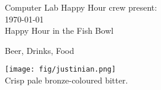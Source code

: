 \documentclass[a4paper,portrait]{article}
\newcommand{\placetextbox}[3]{%
  \setbox0=\hbox{#3}%
  \AddToShipoutPictureFG*{%
    \put(\LenToUnit{#1\paperwidth},\LenToUnit{#2\paperheight}){\vtop{{\null}\makebox[0pt][c]{#3}}}%
  }%
}%
\begin{document}
\sf
\thispagestyle{empty}

\begin{center}

    {\Large Computer Lab Happy Hour crew present:} \\ \smallskip
\today \\ \smallskip
    {\Large Happy Hour in the Fish Bowl }

    \vfill

    {\huge Beer, Drinks, Food}\\ \bigskip \bigskip

    \vfill

    \texttt{[image: fig/justinian.png]} \bigskip \bigskip \\{\large Crisp pale bronze-coloured bitter.}


\end{center}
\end{document}

